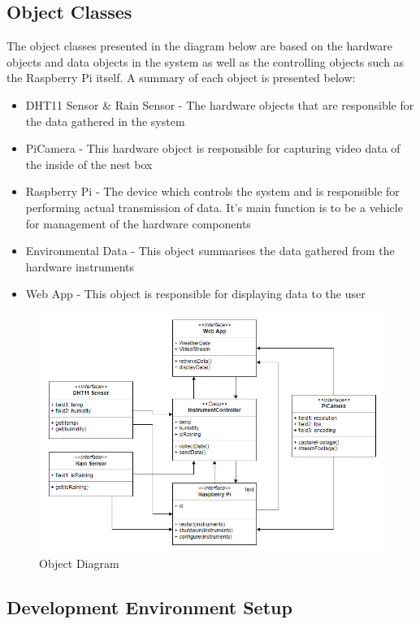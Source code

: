 \documentclass[10pt,a4paper]{article}
\begin{document}
\subsection{Object Classes}
The object classes presented in the diagram below are based on the hardware objects and data objects in the system as well as the controlling objects such as the Raspberry Pi itself. A summary of each object is presented below:
\begin{itemize}
\item DHT11 Sensor \& Rain Sensor - The hardware objects that are responsible for the data gathered in the system
\item PiCamera - This hardware object is responsible for capturing video data of the inside of the nest box
\item Raspberry Pi - The device which controls the system and is responsible for performing actual transmission of data. It's main function is to be a vehicle for management of the hardware components
\item Environmental Data - This object summarises the data gathered from the hardware instruments
\item Web App - This object is responsible for displaying data to the user 
\end{itemize}

\begin{figure}[H]
\centering
  \includegraphics[width=\linewidth]{images/objects.png}
  \caption{Object Diagram}
  \label{fig:objects}
\end{figure}

\subsection{Development Environment Setup}
\end{document}

